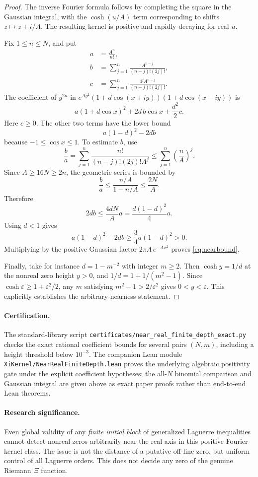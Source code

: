 \begin{proof}
The inverse Fourier formula follows by
completing the square in the Gaussian
integral, with the $\cosh(u/A)$ term
corresponding to shifts $z\mapsto z\pm i/A$.
The resulting kernel is positive and
rapidly decaying for real $u$.

Fix $1\le n\le N$, and put
\begin{align*}
a&=\frac{A^n}{n!},\\
b&=\sum_{j=1}^n
\frac{A^{n-j}}{(n-j)!(2j)!},\\
c&=\sum_{j=1}^n
\frac{4^jA^{n-j}}{(n-j)!(2j)!}.
\end{align*}
The coefficient of $y^{2n}$ in
$e^{Ay^2}(1+d\cos(x+iy))
(1+d\cos(x-iy))$ is
\begin{equation}
a(1+d\cos x)^2
+2d\,b\cos x+\frac{d^2}{2}c.
\label{eq:nearcoefficient}
\end{equation}
Here $c\ge0$. The other two terms have
the lower bound
\[
a(1-d)^2-2db
\]
because $-1\le\cos x\le1$.
To estimate $b$, use
\[
\frac ba=
\sum_{j=1}^n
\frac{n!}{(n-j)!(2j)!A^j}
\le\sum_{j=1}^n\left(\frac nA\right)^j.
\]
Since $A\ge16N\ge2n$, the
geometric series is bounded by
\[
\frac ba\le
\frac{n/A}{1-n/A}\le\frac{2N}{A}.
\]
Therefore
\[
2db\le\frac{4dN}{A}a
=\frac{d(1-d)^2}{4}a.
\]
Using $d<1$ gives
\[
a(1-d)^2-2db
\ge\frac34a(1-d)^2>0.
\]
Multiplying by the positive Gaussian
factor $2\pi A\,e^{-Ax^2}$ proves
\eqref{eq:nearbound}.

Finally, take for instance
$d=1-m^{-2}$ with integer $m\ge2$.
Then $\cosh y=1/d$ at the nonreal
zero height $y>0$, and
$1/d=1+1/(m^2-1)$.
Since $\cosh\varepsilon\ge
1+\varepsilon^2/2$, any
$m$ satisfying
$m^2-1>2/\varepsilon^2$
gives $0<y<\varepsilon$.
This explicitly establishes the
arbitrary-nearness statement.
\end{proof}

\paragraph{Certification.}
The standard-library script
\texttt{certificates/near\_real\_finite\_depth\_exact.py}
checks the exact rational coefficient
bounds for several pairs $(N,m)$,
including a height threshold below
$10^{-3}$. The companion Lean module
\texttt{XiKernel/NearRealFiniteDepth.lean}
proves the underlying algebraic
positivity gate under the explicit
coefficient hypotheses; the
all-$N$ binomial comparison and
Gaussian integral are given above
as exact paper proofs rather than
end-to-end Lean theorems.

\paragraph{Research significance.}
Even global validity of any
\emph{finite initial block}
of generalized Laguerre inequalities
cannot detect nonreal zeros arbitrarily
near the real axis in this positive
Fourier-kernel class.
The issue is not the distance of a
putative off-line zero, but uniform
control of all Laguerre orders.
This does not decide any zero of
the genuine Riemann $\Xi$ function.
